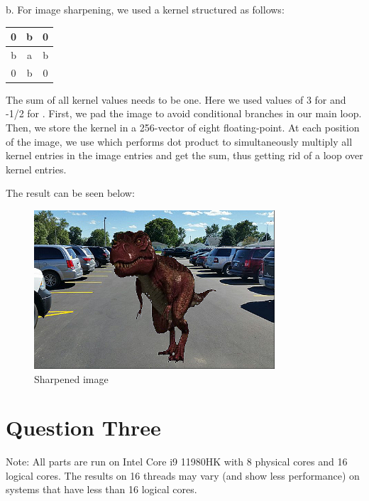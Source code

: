 \documentclass[12pt]{article}
\begin{document}
	b. For image sharpening, we used a kernel structured as follows:
	
	\begin{table}[ht!]
		\centering
		\begin{tabular}{|c|c|c|}
			\hline
			0 & b & 0 \\ \hline
			b & a & b \\ \hline
			0 & b & 0 \\ \hline
		\end{tabular}
	\end{table}
	
	The sum of all kernel values needs to be one. Here we used values of 3 for  and -1/2 for .
	First, we pad the image to avoid conditional branches in our main loop. Then, we store the kernel in a 256-vector of eight floating-point. At each position of the image, we use  which performs dot product to simultaneously multiply all kernel entries in the image entries and get the sum, thus getting rid of a loop over kernel entries.
	
	The result can be seen below:
	
	\begin{figure}[H]
		\centering
		\includegraphics[width=0.8\textwidth]{./images/Q2/sharpened.bmp}	
		\cprotect\caption{Sharpened image}
		\label{fig:2-2}
	\end{figure}
	
	
	\newpage
	
	\section{Question Three}
	
	Note: All parts are run on Intel Core i9 11980HK with 8 physical cores and 16 logical cores. The results on 16 threads may vary (and show less performance) on systems that have less than 16 logical cores.
	
\end{document}
